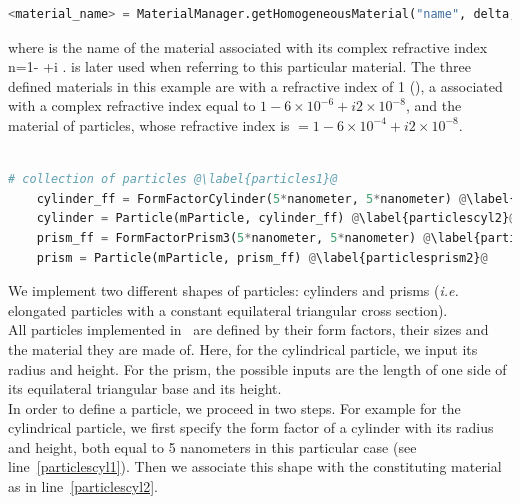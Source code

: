 \begin{lstlisting}[language=python, style=eclipse,numbers=none]
<material_name> = MaterialManager.getHomogeneousMaterial("name", delta, beta)
\end{lstlisting}

\noindent where  is the name of the
material associated with its complex refractive index
n=1- +i .  is later used when
referring to this particular material. The three defined materials in this example are  with a refractive
index of 1 (), a  associated with a complex refractive index
equal to $1-6\times 10^{-6} +i2\times 10^{-8} $, and the material of particles, whose refractive index is $=1-6\times 10^{-4}+i2\times 10^{-8}$.\\\\


\begin{lstlisting}[language=python,style=eclipseboxed,name=ex1,nolol]
    # collection of particles @\label{particles1}@
    cylinder_ff = FormFactorCylinder(5*nanometer, 5*nanometer) @\label{particlescyl1}@
    cylinder = Particle(mParticle, cylinder_ff) @\label{particlescyl2}@
    prism_ff = FormFactorPrism3(5*nanometer, 5*nanometer) @\label{particlesprism1}@
    prism = Particle(mParticle, prism_ff) @\label{particlesprism2}@
\end{lstlisting}

 \noindent We implement two different shapes of particles: cylinders and
 prisms (\textit{i.e.} elongated particles with a constant equilateral triangular cross section).\\ All particles implemented in \BornAgain\ are defined by their
 form factors, their sizes and the material
  they are made of. Here, for the
  cylindrical particle, we input its radius and height.  For the prism, 
  the possible inputs are the length of one side of its equilateral triangular
  base and its height.\\

  
\noindent In order to define a particle, we proceed in two steps. For example for
the cylindrical particle, we first specify the form factor of a cylinder with 
its radius and height, both equal to 5 nanometers in this particular
case (see line~\ref{particlescyl1}). Then we associate this shape with
the constituting material as in line~\ref{particlescyl2}.\\

